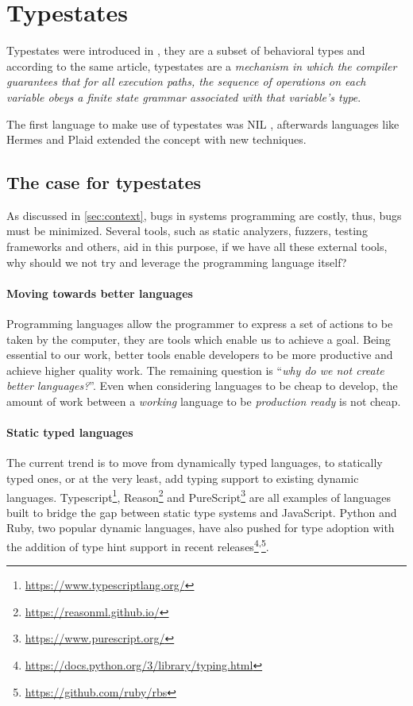 \section{Typestates}\label{sec:typestates}

Typestates were introduced in \autocite{Strom1983},
they are a subset of behavioral types and
according to the same article, typestates are a
\emph{mechanism in which the compiler guarantees that for all execution paths,
the sequence of operations on each variable obeys a finite state grammar associated with that variable's type}.

The first language to make use of typestates was NIL \autocite{Strom1983},
afterwards languages like Hermes \autocite{Strom1990} and Plaid \autocite{Aldrich2009}
extended the concept with new techniques.

\subsection{The case for typestates}

As discussed in \autoref{sec:context}, bugs in systems programming are costly,
thus, bugs must be minimized.
Several tools, such as static analyzers, fuzzers, testing frameworks and others,
aid in this purpose, if we have all these external tools,
why should we not try and leverage the programming language itself?

\paragraph{Moving towards better languages}
Programming languages allow the programmer to express a set of actions to be taken by the computer,
they are tools which enable us to achieve a goal.
Being essential to our work, better tools enable developers to be more productive and achieve higher quality work.
The remaining question is “\emph{why do we not create better languages?}”.
Even when considering languages to be cheap to develop,
the amount of work between a \emph{working} language to be \emph{production ready} is not cheap.


\paragraph{Static typed languages} The current trend is to move from dynamically typed languages,
to statically typed ones, or at the very least, add typing support to existing dynamic languages.
Typescript\footnote{\url{https://www.typescriptlang.org/}},
Reason\footnote{\url{https://reasonml.github.io/}} and
PureScript\footnote{\url{https://www.purescript.org/}}
are all examples of languages built to bridge the gap between static type systems and JavaScript.
Python and Ruby, two popular dynamic languages, have also pushed for type adoption
with the addition of type hint support in recent
releases\footnote{\url{https://docs.python.org/3/library/typing.html}}\textsuperscript{,}\footnote{\url{https://github.com/ruby/rbs}}.



